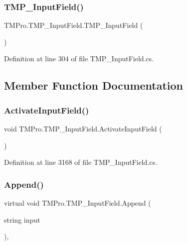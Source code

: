 \subsubsection{\texorpdfstring{TMP\_InputField()}{TMP\_InputField()}}
{\footnotesize\ttfamily T\+M\+Pro.\+T\+M\+P\+\_\+\+Input\+Field.\+T\+M\+P\+\_\+\+Input\+Field (\begin{DoxyParamCaption}{ }\end{DoxyParamCaption})\hspace{0.3cm}{\ttfamily [protected]}}



Definition at line 304 of file T\+M\+P\+\_\+\+Input\+Field.\+cs.



\subsection{Member Function Documentation}
\mbox{\label{class_t_m_pro_1_1_t_m_p___input_field_ac9c67e94d54028f82f604b75bdeac336}} 
\subsubsection{\texorpdfstring{ActivateInputField()}{ActivateInputField()}}
{\footnotesize\ttfamily void T\+M\+Pro.\+T\+M\+P\+\_\+\+Input\+Field.\+Activate\+Input\+Field (\begin{DoxyParamCaption}{ }\end{DoxyParamCaption})}



Definition at line 3168 of file T\+M\+P\+\_\+\+Input\+Field.\+cs.

\mbox{\label{class_t_m_pro_1_1_t_m_p___input_field_a3d675445c819058d84bfa8b8889fb119}} 
\subsubsection{\texorpdfstring{Append()}{Append()}\hspace{0.1cm}{\footnotesize\ttfamily [1/2]}}
{\footnotesize\ttfamily virtual void T\+M\+Pro.\+T\+M\+P\+\_\+\+Input\+Field.\+Append (\begin{DoxyParamCaption}\item[{string}]{input }\end{DoxyParamCaption})\hspace{0.3cm}{\ttfamily [protected]}, {\ttfamily [virtual]}}



